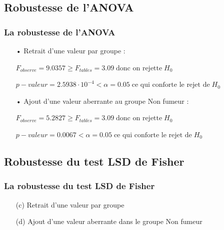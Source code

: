 \documentclass{beamer}
\begin{document}
\subsection{Robustesse de l'ANOVA}
\begin{frame}
	\frametitle{La robustesse de l'ANOVA}	
\begin{itemize}
\item[•] Retrait d'une valeur par groupe :
\item[] $ F_{observe} = 9.0357 \ge F_{tables}=3.09 \; \text{donc on rejette} \; H_0 $
\item[] $ p-valeur=2.5938 \cdot 10^{-4} < \alpha=0.05 \; \text{ce qui conforte le rejet de} \; H_0 $
\item[]
\item[•] Ajout d'une valeur aberrante au groupe Non fumeur :
\item[] $ F_{observe} = 5.2827 \ge F_{tables}=3.09 \; \text{donc on rejette} \; H_0 $
\item[] $ p-valeur=0.0067 < \alpha=0.05 \; \text{ce qui conforte le rejet de} \; H_0 $
\end{itemize}
\end{frame}

\subsection{Robustesse du test LSD de Fisher}
\begin{frame}
	\frametitle{La robustesse du test LSD de Fisher}
	
	\begin{figure}[H]
	\centering
	    \qquad
    \end{figure}
    
    \begin{itemize}
		\item[(c)] Retrait d'une valeur par groupe
		\item[(d)] Ajout d'une valeur aberrante dans le groupe Non fumeur
	\end{itemize}
	
\end{frame} 
\end{document}
